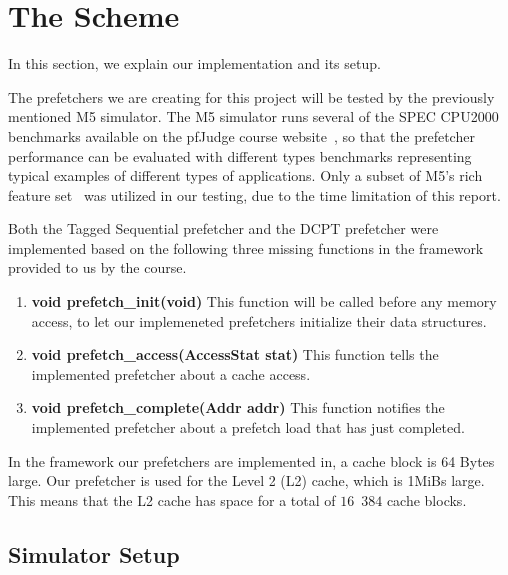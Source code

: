 \section{The Scheme}

In this section, we explain our implementation and its setup.

The prefetchers we are creating for this project will be tested by the
previously mentioned M5 simulator. The M5 simulator runs several of the SPEC
CPU2000 benchmarks available on the pfJudge course website~\cite{guidelines}, so
that the prefetcher performance can be evaluated with different types benchmarks
representing typical examples of different types of applications. Only a subset
of M5's rich feature set~\cite[Ch.~2]{user_doc} was utilized in our testing,
due to the time limitation of this report.

Both the Tagged Sequential prefetcher and the DCPT prefetcher were implemented
based on the following three missing functions in the framework provided to us
by the course\cite[Ch.~3]{user_doc}.
\begin{enumerate}
	\item \textbf{void prefetch\_init(void)}
		This function will be called before any memory access, to let our
		implemeneted prefetchers initialize their data structures.
	\item \textbf{void prefetch\_access(AccessStat stat)}
		This function tells the implemented prefetcher about a cache access.
	\item \textbf{void prefetch\_complete(Addr addr)}
		This function notifies the implemented prefetcher about a prefetch load
		that has just completed.
\end{enumerate}

In the framework our prefetchers are implemented in, a cache block is 64 Bytes
large. Our prefetcher is used for the Level 2 (L2) cache, which is 1MiBs large.
This means that the L2 cache has space for a total of $16$~$384$ cache blocks.

\subsection{Simulator Setup}


